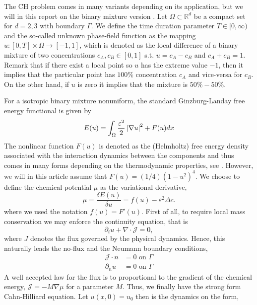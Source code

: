 The CH problem comes in many variants depending on its application, but we will in this report on the binary mixture version \cite{miranville2017cahn}. Let $\Omega \subset  \mathbb{R} ^{d} $ be a compact set for $d=2,3$ with boundary
$\Gamma $. We define the time duration parameter $T \in  [0,\infty) $ and the
so-called unknown phase-field function as the
mapping $u: \left[ 0,T \right] \times \Omega  \to \left[ -1,1 \right]  $, which is denoted as the local difference of a binary mixture of two concentrations $c_{A}, c_{B} \in \left[ 0,1\right] $ s.t. $u = c_{A} -c_{B}$ and $c_{A} + c_{B} = 1$. Remark that if there exist a
local point so $u$ has the extreme value $-1$, then it implies that the particular point has $100\%$ concentration $c_{A}$ and vice-versa for $c_{B}$. On the other hand, if $u$ is zero it implies that the mixture is $50\% - 50\%$.

For a isotropic
binary mixture nonuniform, the standard Ginzburg-Landay free energy functional is given by \[
E( u)  = \int_{\Omega }^{} \frac{\varepsilon ^2}{2} \left\lvert  \nabla u  \right\rvert ^2 + F( u) dx
\]
The nonlinear function $F( u) $ is denoted as the (Helmholtz) free energy density associated with the interaction dynamics between the components and thus comes in many forms depending on the thermodynamic properties, see \cite{miranville2017cahn}.
However, we will in this article assume that $F( u) = ( 1 / 4 ) ( 1- u^2) ^{4} $.
We choose to define the chemical potential $\mu $ as the variational derivative,
\[
\mu = \frac{ \delta E( u) }{ \delta  u} = f( u)  - \varepsilon ^{2} \Delta c .
\]
where we used the notation $f( u) = F'( u) $.
First of all, to require local mass conservation we may enforce the continuity equation, that is \[
\partial _{t} u + \nabla \cdot \mathcal{J}  = 0,
\]
where $J$ denotes the flux governed by the physical dynamics. Hence, this naturally leads the no-flux and the Neumann boundary conditions,
\begin{equation}
\label{eq:conservation}
    \begin{split}
\mathcal{J}  \cdot n & = 0 \text{ on } \Gamma \\
\partial _{n} u & = 0 \text{ on } \Gamma
    \end{split}
\end{equation}
 A well accepted law for the flux  is to proportional to the gradient of the chemical energy, $\mathcal{J} = - M  \nabla \mu  $ for a parameter $M$.
Thus, we finally have the strong form Cahn-Hilliard equation. Let $ u( x,0) =  u_{0}$ then is the dynamics on the form,

